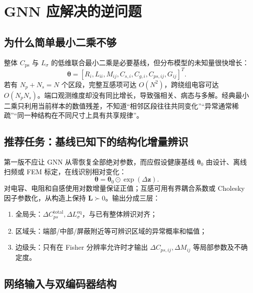 \documentclass[UTF8,11pt,a4paper]{ctexart}
\newcommand{\Cps}{C_{\mathrm{ps}}}
\newcommand{\Ls}{L_{\sigma}}
\newcommand{\LL}{\bm L}
\begin{document}
\section{GNN 应解决的逆问题}

\subsection{为什么简单最小二乘不够}

整体 $\Cps$ 与 $\Ls$ 的低维联合最小二乘是必要基线，但分布模型的未知量很快增长：
\begin{equation}
\bm\theta=
[R_i,L_{ii},M_{ij},C_{s,i},C_{g,i},C_{ps,ij},G_{ij}]^T.
\end{equation}
若有 $N_p+N_s=N$ 个区段，完整互感项可达 $O(N^2)$，跨绕组电容可达 $O(N_pN_s)$。端口观测维度却没有同比增长，导致强相关、病态与多解。经典最小二乘只利用当前样本的数值残差，不知道“相邻区段往往共同变化”“异常通常稀疏”“同一种结构在不同尺寸上具有共享规律”。

\subsection{推荐任务：基线已知下的结构化增量辨识}

第一版不应让 GNN 从零恢复全部绝对参数，而应假设健康基线 $\bm\theta_0$ 由设计、离线扫频或 FEM 标定，在线识别相对变化：
\begin{equation}
\bm\theta=\bm\theta_0\odot\exp(\Delta\bm z).
\end{equation}
对电容、电阻和自感使用对数增量保证正值；互感可用有界耦合系数或 Cholesky 因子参数化，从构造上保持 $\LL\succ0$。输出分成三层：
\begin{enumerate}
\item 全局头：$\Delta C_{ps}^{\mathrm{total}},\Delta L_{\sigma}^{\mathrm{eq}}$，与已有整体辨识对齐；
\item 区域头：端部/中部/屏蔽附近等可辨识区域的异常概率和幅值；
\item 边级头：只有在 Fisher 分辨率允许时才输出 $\Delta C_{ps,ij},\Delta M_{ij}$ 等局部参数及不确定度。
\end{enumerate}

\subsection{网络输入与双编码器结构}
\end{document}
